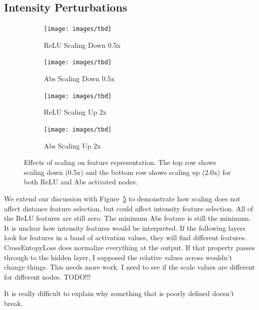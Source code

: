 \subsection{Intensity Perturbations}

\begin{figure}[t]
    \centering

    \begin{subfigure}[b]{0.49\textwidth}
        \centering
        \texttt{[image: images/tbd]}
        \caption{ReLU Scaling Down 0.5x}
        \label{fig:relu_scale_down}
    \end{subfigure}
    \hfill
    \begin{subfigure}[b]{0.49\textwidth}
        \centering
        \texttt{[image: images/tbd]}
        \caption{Abs Scaling Down 0.5x}
        \label{fig:relu_scale_down}
    \end{subfigure}

    \begin{subfigure}[b]{0.49\textwidth}
    \centering
    \texttt{[image: images/tbd]}
    \caption{ReLU Scaling Up 2x}
    \label{fig:relu_scale_up}
    \end{subfigure}
    \hfill
    \begin{subfigure}[b]{0.49\textwidth}
    \centering
    \texttt{[image: images/tbd]}
    \caption{Abs Scaling Up 2x}
    \label{fig:abs_scale_up}
    \end{subfigure}

    \caption{Effects of scaling on feature representation. The top row shows scaling down (0.5x) and the bottom row shows scaling up (2.0x) for both ReLU and Abs activated nodes.}
    \label{fig:scaling_demo}
\end{figure}

We extend our discussion with Figure~\ref{fig:scaling_demo} to demonstrate how scaling does not affect distance feature selection, but could affect intensity feature selection. All of the ReLU features are still zero. The minimum Abs feature is still the minimum. It is unclear how intensity features would be interpreted. If the following layers look for features in a band of activation values, they will find different features. CrossEntopyLoss does normalize everything at the output. If that property passes through to the hidden layer, I supposed the relative values across wouldn't change things. This needs more work. I need to see if the scale values are different for different nodes. TODO!!!

It is really difficult to explain why something that is poorly defined doesn't break.

